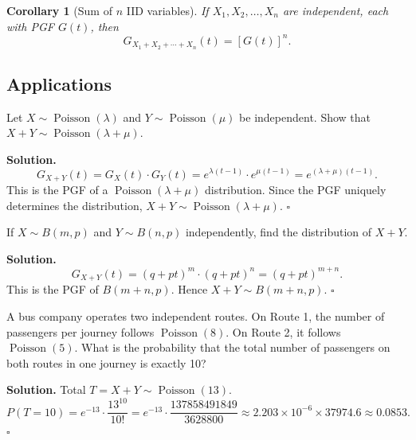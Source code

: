 \documentclass[12pt, a4paper, oneside]{book}
\theoremstyle{definition}
\theoremstyle{plain}
\newtheorem{corollary}{Corollary}[theorem]
\theoremstyle{remark}
\newenvironment{solution}
  {\par\medskip\noindent\textbf{Solution.}\quad}
  {\hfill$\square$\par\medskip}
\begin{document}
\begin{corollary}[Sum of $n$ IID variables]
If $X_1,X_2,\ldots,X_n$ are independent, each with PGF $G(t)$, then
\[
  G_{X_1+X_2+\cdots+X_n}(t) = [G(t)]^n.
\]
\end{corollary}

\subsection{Applications}

\begin{workedexample}
Let $X\sim\operatorname{Poisson}(\lambda)$ and $Y\sim\operatorname{Poisson}(\mu)$
be independent.  Show that $X+Y\sim\operatorname{Poisson}(\lambda+\mu)$.

\begin{solution}
\[
  G_{X+Y}(t) = G_X(t)\cdot G_Y(t) = e^{\lambda(t-1)}\cdot e^{\mu(t-1)}
  = e^{(\lambda+\mu)(t-1)}.
\]
This is the PGF of a $\operatorname{Poisson}(\lambda+\mu)$ distribution.
Since the PGF uniquely determines the distribution, $X+Y\sim\operatorname{Poisson}(\lambda+\mu)$.
\end{solution}
\end{workedexample}

\begin{workedexample}
If $X\sim B(m,p)$ and $Y\sim B(n,p)$ independently, find the distribution of $X+Y$.

\begin{solution}
\[
  G_{X+Y}(t)=(q+pt)^m\cdot(q+pt)^n=(q+pt)^{m+n}.
\]
This is the PGF of $B(m+n,p)$.  Hence $X+Y\sim B(m+n,p)$.
\end{solution}
\end{workedexample}

\begin{workedexample}
A bus company operates two independent routes.  On Route 1, the number of
passengers per journey follows $\operatorname{Poisson}(8)$.  On Route 2, it
follows $\operatorname{Poisson}(5)$.  What is the probability that the total
number of passengers on both routes in one journey is exactly 10?

\begin{solution}
Total $T = X+Y\sim\operatorname{Poisson}(13)$.
\[
  P(T=10) = e^{-13}\cdot\frac{13^{10}}{10!}
  = e^{-13}\cdot\frac{137858491849}{3628800}
  \approx 2.203\times10^{-6}\times 37974.6
  \approx 0.0853.
\]
\end{solution}
\end{workedexample}
\end{document}
